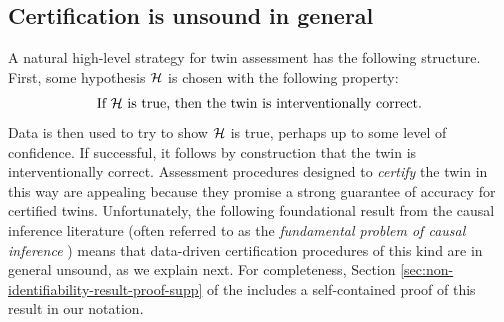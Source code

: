 \subsection{Certification is unsound in general}

A natural high-level strategy for twin assessment has the following structure.
First, some hypothesis $\mathcal{H}$ is chosen with the following property:
 \begin{equation} \label{eq:verification-hypothesis-property}
    \text{If $\Hyp$ is true, then the twin is interventionally correct.}%
\end{equation}
Data is then used to try to show $\mathcal{H}$ is true, perhaps up to some level of confidence. %
If successful, it follows by construction that the twin is interventionally correct.
Assessment procedures designed to \emph{certify} the twin in this way are appealing because they promise a strong guarantee of accuracy for certified twins. %
Unfortunately, the following foundational result from the causal inference literature (often referred to as the \emph{fundamental problem of causal inference} \citep{holland1986statistics}) means that data-driven certification procedures of this kind are in general unsound, as we explain next.
For completeness, Section \ref{sec:non-identifiability-result-proof-supp} of the \AppendixName includes a self-contained proof of this result in our notation.




